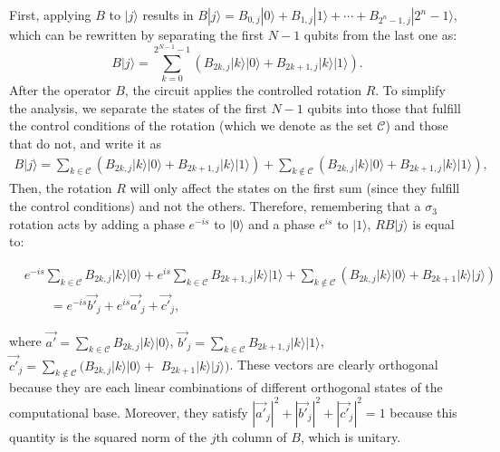 \documentclass[10pt,letterpaper]{article} %
\begin{document}
First, applying $B$ to $|j\rangle$ results in $B|j\rangle = B_{0,j} |0\rangle + B_{1,j} |1 \rangle + \cdots + B_{2^n-1,j}|2^n-1\rangle$,
which can be rewritten by separating the
first $N-1$ qubits from the last one as:
\begin{equation}
B|j\rangle = \sum_{k=0}^{2^{N-1}-1} \left( B_{2k,j} |k\rangle |0\rangle + B_{2k+1,j} |k\rangle |1 \rangle \right).
\end{equation}
After the operator $B$, the circuit applies the  controlled rotation $R$.
To simplify the analysis, we separate the states of
the first $N-1$ qubits into those that fulfill the control conditions of the rotation
(which we denote as the set $\mathcal{C}$)
and those that do not, and write it as
\begin{eqnarray}
B|j\rangle = \sum_{k \in \mathcal{C}} \left(B_{2k,j} |k\rangle |0\rangle + B_{2k+1,j} |k\rangle |1 \rangle \right) + \sum_{k \not\in \mathcal{C}} \left( B_{2k,j} |k\rangle |0\rangle + B_{2k+1,j}|k\rangle |1\rangle \right),
\end{eqnarray}
Then, the rotation $R$ will only affect the states on the first sum (since they fulfill the control conditions)
and not the others. Therefore,  
remembering that a $\sigma_3$ rotation acts by adding a phase $e^{-is}$ to $|0\rangle$
and a phase $e^{is}$ to $|1\rangle$, $RB|j\rangle$ is equal to:
\begin{small}
\begin{eqnarray}
&e^{-is} \sum_{k \in \mathcal{C}} B_{2k,j} |k\rangle |0\rangle + e^{is} \sum_{k \in \mathcal{C}} B_{2k+1,j} |k\rangle |1 \rangle 
+ \sum_{k \not\in \mathcal{C}} \left( B_{2k,j} |k\rangle |0\rangle + B_{2k+1} |k\rangle |j \rangle \right)\\
& \qquad = e^{-is} \vec{b'}_j + e^{is} \vec{a'}_j + \vec{c'}_j,
\end{eqnarray}
\end{small}
where $\vec{a'} = \sum_{k \in \mathcal{C}} B_{2k,j}|k\rangle|0\rangle$, $\vec{b'}_j = \sum_{k \in \mathcal{C}} B_{2k+1,j} |k\rangle |1 \rangle$, $\vec{c'}_j =\sum_{k \not\in \mathcal{C}} \big( B_{2k,j} |k\rangle |0\rangle+$ $ B_{2k+1} |k\rangle |j \rangle \big)$.
 These vectors are clearly orthogonal because they are each linear combinations of different 
orthogonal states of the computational base. 
Moreover, they satisfy $|\vec{a'}_j|^2 + |\vec{b'}_j|^2 + |\vec{c'}_j|^2 = 1$ because this quantity is the squared norm of the $j$th column of $B$, 
which is unitary.
\end{document}
